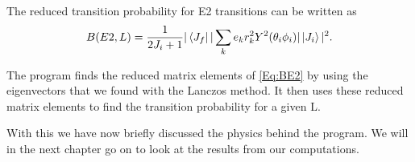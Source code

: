 The reduced transition probability for E2 transitions can be written as
\begin{align}
	B(E2,L) = \frac{1}{2J_i+1}|\bra{J_f}|\sum_ke_kr_k^2Y^2(\theta_i\phi_i)|\ket{J_i}|^2.
	\label{Eq:BE2}
\end{align}

The program finds the reduced matrix elements of \ref{Eq:BE2} by using the
eigenvectors that we found with the Lanczos method. It then uses these
reduced matrix elements to find the transition probability for a given L.

With this we have now briefly discussed the physics behind the program. We will
in the next chapter go on to look at the results from our computations.
